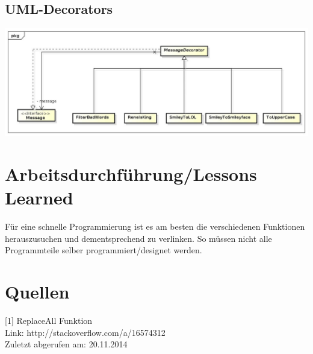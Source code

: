 \documentclass[a4paper, 11pt]{article}
\begin{document}
\newpage
\subsection{UML-Decorators}
\includegraphics[width=15.5cm]{Decorators}


\section{Arbeitsdurchführung/Lessons Learned}

Für eine schnelle Programmierung ist es am besten die verschiedenen Funktionen herauszusuchen und dementsprechend zu verlinken.
So müssen nicht alle Programmteile selber programmiert/designet werden.



\section{Quellen}
[1] ReplaceAll Funktion \\
Link: http://stackoverflow.com/a/16574312 \\
Zuletzt abgerufen am: 20.11.2014 \\
\end{document}
